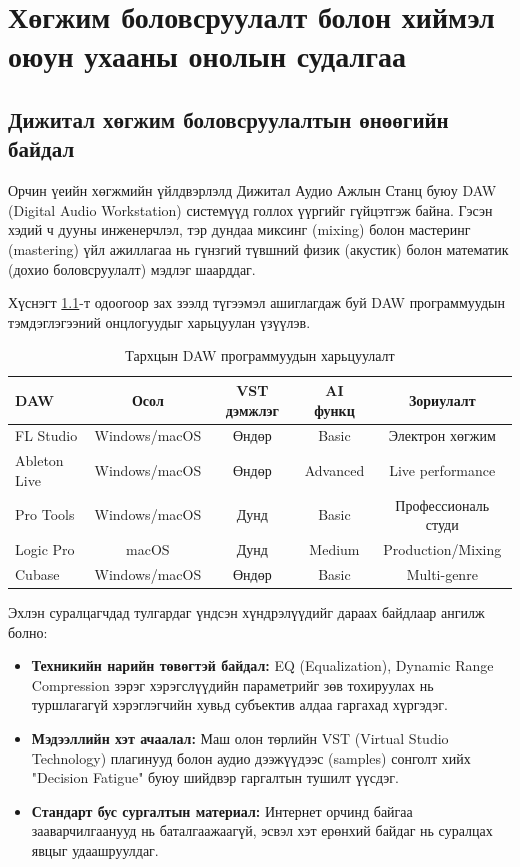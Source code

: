 
\chapter{Хөгжим боловсруулалт болон хиймэл оюун ухааны онолын судалгаа}
\label{Chapter1}

\section{Дижитал хөгжим боловсруулалтын өнөөгийн байдал}

Орчин үеийн хөгжмийн үйлдвэрлэлд Дижитал Аудио Ажлын Станц буюу DAW (Digital Audio Workstation) системүүд голлох үүргийг гүйцэтгэж байна. Гэсэн хэдий ч дууны инженерчлэл, тэр дундаа миксинг (mixing) болон мастеринг (mastering) үйл ажиллагаа нь гүнзгий түвшний физик (акустик) болон математик (дохио боловсруулалт) мэдлэг шаарддаг.

Хүснэгт \ref{tab:DAWComparison}-т одоогоор зах зээлд түгээмэл ашиглагдаж буй DAW программуудын тэмдэглэгээний онцлогуудыг харьцуулан үзүүлэв.

\begin{table}[htbp]
\centering
\caption{Тархцын DAW программуудын харьцуулалт}
\label{tab:DAWComparison}
\begin{tabular}{|l|c|c|c|c|}
\hline
\textbf{DAW} & \textbf{Осол} & \textbf{VST дэмжлэг} & \textbf{AI функц} & \textbf{Зориулалт} \\
\hline
FL Studio & Windows/macOS & Өндөр & Basic & Электрон хөгжим \\
\hline
Ableton Live & Windows/macOS & Өндөр & Advanced & Live performance \\
\hline
Pro Tools & Windows/macOS & Дунд & Basic & Профессиональ студи \\
\hline
Logic Pro & macOS & Дунд & Medium & Production/Mixing \\
\hline
Cubase & Windows/macOS & Өндөр & Basic & Multi-genre \\
\hline
\end{tabular}
\end{table}

Эхлэн суралцагчдад тулгардаг үндсэн хүндрэлүүдийг дараах байдлаар ангилж болно:
\begin{itemize}
    \item \textbf{Техникийн нарийн төвөгтэй байдал:} EQ (Equalization), Dynamic Range Compression зэрэг хэрэгслүүдийн параметрийг зөв тохируулах нь туршлагагүй хэрэглэгчийн хувьд субъектив алдаа гаргахад хүргэдэг.
    \item \textbf{Мэдээллийн хэт ачаалал:} Маш олон төрлийн VST (Virtual Studio Technology) плагинууд болон аудио дээжүүдээс (samples) сонголт хийх "Decision Fatigue" буюу шийдвэр гаргалтын тушилт үүсдэг.
    \item \textbf{Стандарт бус сургалтын материал:} Интернет орчинд байгаа зааварчилгаанууд нь баталгаажаагүй, эсвэл хэт ерөнхий байдаг нь суралцах явцыг удаашруулдаг.
\end{itemize}

